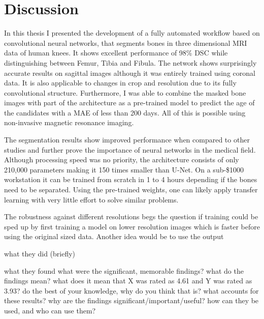 \section{Discussion}

In this thesis I presented the development of a fully automated workflow based on convolutional neural networks, that segments bones in three dimensional MRI data of human knees. It shows excellent performance of 98\% DSC while distinguishing between Femur, Tibia and Fibula. The network shows surprisingly accurate results on sagittal images although it was entirely trained using coronal data. It is also applicable to changes in crop and resolution due to its fully convolutional structure. Furthermore, I was able to combine the masked bone images with part of the architecture as a pre-trained model to predict the age of the candidates with a MAE of less than 200 days. All of this is possible using non-invasive magnetic resonance imaging.

The segmentation results show improved performance when compared to other studies and further prove the importance of neural networks in the medical field. Although processing speed was no priority, the architecture consists of only 210,000 parameters making it 150 times smaller than U-Net. On a sub-\$1000 workstation it can be trained from scratch in 1 to 4 hours depending if the bones need to be separated. Using the pre-trained weights, one can likely apply transfer learning with very little effort to solve similar problems.

The robustness against different resolutions begs the question if training could be sped up by first training a model on lower resolution images which is faster before using the original sized data. Another idea would be to use the output 


what they did (briefly)

what they found
what were the significant, memorable findings?
what do the findings mean?
what does it mean that X was rated as 4.61 and Y was rated as 3.93?
do the best of your knowledge, why do you think that is? what accounts for these results?
why are the findings significant/important/useful? how can they be used, and who can use them?

\newpage
